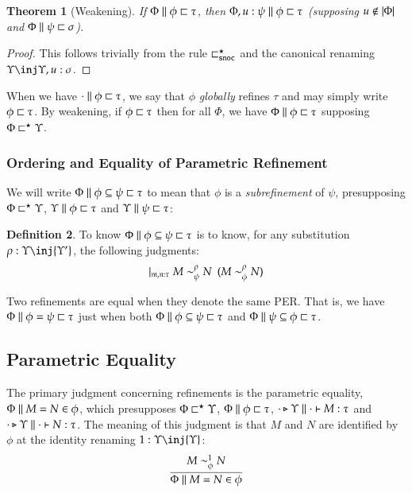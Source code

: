 \documentclass[11pt]{article}
\newtheorem{thm}{Theorem}[section]
\theoremstyle{definition}
\newtheorem{definition}[thm]{Definition}
\theoremstyle{remark}
\numberwithin{equation}{section}
\def\IModeColorName{MidnightBlue}
\def\OModeColorName{Maroon}
\def\IModeColorName{Black}
\def\OModeColorName{Black}
\newcommand\IMode[1]{{\color{\IModeColorName}{#1}}}
\newcommand\OMode[1]{{\color{\OModeColorName}{#1}}}
\newcommand\HypJ[2]{#1\ \ (#2)}
\newcommand\GenJ[2]{\vert_{\IMode{#1}}\; #2}
\newcommand\Of[2]{\IMode{#1}: \IMode{#2}}
\newcommand\IsAbtUnmoded[5]{
  #1\triangleright%
  #2\parallel%
  #3\vdash%
  #4:\OMode{#5}%
}
\newcommand\IsAbt[5]{\IsAbtUnmoded{\IMode{#1}}{\IMode{#2}}{\IMode{#3}}{\IMode{#4}}{\OMode{#5}}}
\newcommand\MV[1]{\mathfrak{#1}}
\newcommand\Dom[1]{\left\vert#1\right\vert}
\newcommand\NotIn[2]{\IMode{#1}\notin\IMode{#2}}
\newcommand\Refines[3]{\IMode{#1}\parallel\IMode{#2}\sqsubset\OMode{#3}}
\newcommand\GRefines[2]{\IMode{#1}\sqsubset\OMode{#2}}
\newcommand\RefinesCtx[2]{\IMode{#1}\sqsubset^\star\OMode{#2}}
\newcommand\EqRefines[4]{\IMode{#1}\parallel\IMode{#2}=\IMode{#3}\sqsubset\OMode{#4}}
\newcommand\RMemEq[4]{\IMode{#1}\parallel\IMode{#2}=\IMode{#3}\in\IMode{#4}}
\newcommand\SubRefines[4]{\IMode{#1}\parallel\IMode{#2}\subseteq\IMode{#3}\sqsubset\OMode{#4}}
\begin{document}
\begin{thm}[Weakening]
  If $\Refines{\Phi}{\phi}{\tau}$, then $\Refines{\Phi,u:\psi}{\phi}{\tau}$ (supposing
  $\NotIn{u}{\Dom\Phi}$ and $\Refines{\Phi}{\psi}{\sigma}$).
\end{thm}
\begin{proof}
  This follows trivially from the rule $\sqsubset^\star_{\mathtt{snoc}}$ and the canonical renaming
  $\Upsilon\inj\Upsilon,u:\sigma$.
\end{proof}

When we have $\Refines{\cdot}{\phi}{\tau}$, we say that $\phi$ \emph{globally}
refines $\tau$ and may simply write $\GRefines{\phi}{\tau}$. By weakening, if
$\GRefines{\phi}{\tau}$ then for all $\Phi$, we have
$\Refines{\Phi}{\phi}{\tau}$ supposing $\RefinesCtx{\Phi}{\Upsilon}$.

\subsubsection{Ordering and Equality of Parametric Refinement}

We will write $\SubRefines{\Phi}{\phi}{\psi}{\tau}$ to mean that $\phi$ is a
\emph{subrefinement} of $\psi$, presupposing $\RefinesCtx{\Phi}{\Upsilon}$,
$\Refines{\Upsilon}{\phi}{\tau}$ and $\Refines{\Upsilon}{\psi}{\tau}$:
\begin{definition}
  To know $\SubRefines{\Phi}{\phi}{\psi}{\tau}$ is to know, for any substitution
  $\Of{\rho}{\Upsilon\inj\OMode{\Upsilon'}}$, the following judgments:
  \[
    \GenJ{
      \MV{m},\MV{n}:\tau
    }{
      \HypJ{
        \IMode{M}\sim^\rho_\psi\IMode{N}
      }{
        \IMode{M}\sim^\rho_\phi\IMode{N}
      }
    }
  \]
\end{definition}

Two refinements are equal when they denote the same PER. That is, we have
$\EqRefines{\Phi}{\phi}{\psi}{\tau}$ just when both
$\SubRefines{\Phi}{\phi}{\psi}{\tau}$ and $\SubRefines{\Phi}{\psi}{\phi}{\tau}$.

\subsection{Parametric Equality}

The primary judgment concerning refinements is the parametric equality,
$\RMemEq{\Phi}{M}{N}{\phi}$, which presupposes $\RefinesCtx{\Phi}{\Upsilon}$,
$\Refines{\Phi}{\phi}{\tau}$, $\IsAbt{\cdot}{\Upsilon}{\cdot}{M}{\tau}$ and
$\IsAbt{\cdot}{\Upsilon}{\cdot}{N}{\tau}$. The meaning of this judgment is that
$M$ and $N$ are identified by $\phi$ at the identity renaming
$\Of{1}{\IMode{\Upsilon}\inj\OMode{\Upsilon}}$:
\[
  \infer{
    \RMemEq{\Phi}{M}{N}{\phi}
  }{
    \IMode{M}\sim^1_\phi\IMode{N}
  }
\]
\end{document}
